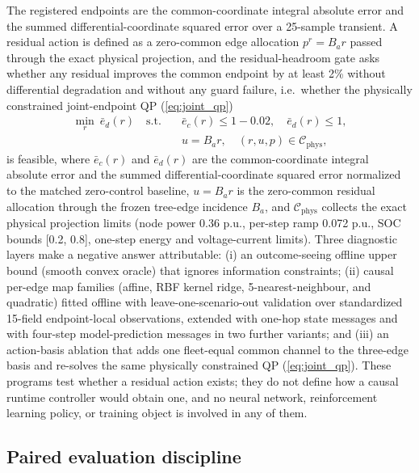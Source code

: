 \documentclass[journal]{IEEEtran}
\begin{document}
The registered endpoints are the common-coordinate integral absolute error and the summed differential-coordinate squared error over a 25-sample transient. A residual action is defined as a zero-common edge allocation $p^r = B_a r$ passed through the exact physical projection, and the residual-headroom gate asks whether any residual improves the common endpoint by at least 2\% without differential degradation and without any guard failure, i.e.\ whether the physically constrained joint-endpoint QP (\ref{eq:joint_qp})
\begin{equation}
\begin{aligned}
\min_{r}\ \bar{e}_d(r)\quad \text{s.t.}\quad & \bar{e}_c(r) \le 1 - 0.02, \quad \bar{e}_d(r) \le 1,\\
& u = B_a r, \quad (r,u,p) \in \mathcal{C}_{\mathrm{phys}},
\end{aligned}
\label{eq:joint_qp}
\end{equation}
is feasible, where $\bar{e}_c(r)$ and $\bar{e}_d(r)$ are the common-coordinate integral absolute error and the summed differential-coordinate squared error normalized to the matched zero-control baseline, $u = B_a r$ is the zero-common residual allocation through the frozen tree-edge incidence $B_a$, and $\mathcal{C}_{\mathrm{phys}}$ collects the exact physical projection limits (node power 0.36 p.u., per-step ramp 0.072 p.u., SOC bounds [0.2, 0.8], one-step energy and voltage-current limits). Three diagnostic layers make a negative answer attributable: (i) an outcome-seeing offline upper bound (smooth convex oracle) that ignores information constraints; (ii) causal per-edge map families (affine, RBF kernel ridge, 5-nearest-neighbour, and quadratic) fitted offline with leave-one-scenario-out validation over standardized 15-field endpoint-local observations, extended with one-hop state messages and with four-step model-prediction messages in two further variants; and (iii) an action-basis ablation that adds one fleet-equal common channel to the three-edge basis and re-solves the same physically constrained QP (\ref{eq:joint_qp}). These programs test whether a residual action exists; they do not define how a causal runtime controller would obtain one, and no neural network, reinforcement learning policy, or training object is involved in any of them.

\subsection{Paired evaluation discipline}
\label{sec:paired}
\end{document}
